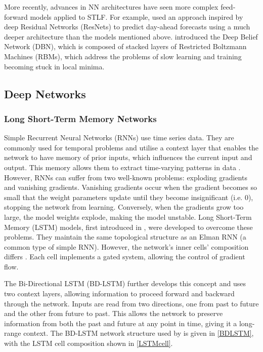 \documentclass[mstat,12pt]{unswthesis}
\begin{document}
More recently, advances in NN architectures have seen more complex feed-forward models applied to STLF. For example,  \cite{Chen2018} used an approach inspired by deep Residual Networks (ResNets) to predict day-ahead forecasts using a much deeper architecture than the models mentioned above. \cite{Hinton2006} introduced the Deep Belief Network (DBN), which is composed of stacked layers of Restricted Boltzmann Machines (RBMs), which address the problems of slow learning and training becoming stuck in local minima.

\subsection{Deep Networks}
\subsubsection{Long Short-Term Memory Networks}
Simple Recurrent Neural Networks (RNNs) use time series data. They are commonly used for temporal problems and utilise a context layer that enables the network to have memory of prior inputs, which influences the current input and output. This memory allows them to extract time-varying patterns in data \cite{Hewamalage2020}. However, RNNs can suffer from two well-known problems: exploding gradients and vanishing gradients. Vanishing gradients occur when the gradient becomes so small that the weight parameters update until they become insignificant (i.e. 0), stopping the network from learning. Conversely, when the gradients grow too large, the model weights explode, making the model unstable. Long Short-Term Memory (LSTM) models, first introduced in \cite{Hochreiter1997}, were developed to overcome these problems. They maintain the same topological structure as an Elman RNN (a common type of simple RNN). However, the network's inner cells' composition differs \cite{Gasparin2021}. Each cell implements a gated system, allowing the control of gradient flow.

The Bi-Directional LSTM (BD-LSTM) further develops this concept and uses two context layers, allowing information to proceed forward and backward through the network. Inputs are read from two directions, one from past to future and the other from future to past. This allows the network to preserve information from both the past and future at any point in time, giving it a long-range context. The BD-LSTM network structure used by \cite{Chandra2021} is given in \ref{BDLSTM}, with the LSTM cell composition shown in \ref{LSTMcell}.
\end{document}
